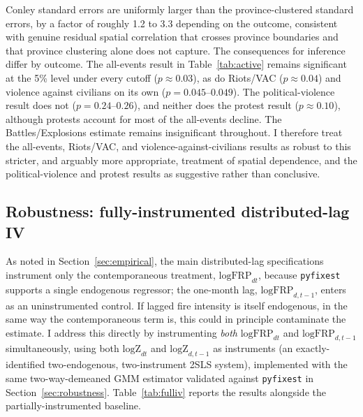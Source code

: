 \documentclass[12pt]{article}
\begin{document}
Conley standard errors are uniformly larger than the province-clustered standard errors, by a factor of roughly 1.2 to 3.3 depending on the outcome, consistent with genuine residual spatial correlation that crosses province boundaries and that province clustering alone does not capture. The consequences for inference differ by outcome. The all-events result in Table~\ref{tab:active} remains significant at the 5\% level under every cutoff ($p \approx 0.03$), as do Riots/VAC ($p \approx 0.04$) and violence against civilians on its own ($p=0.045$--$0.049$). The political-violence result does not ($p=0.24$--$0.26$), and neither does the protest result ($p \approx 0.10$), although protests account for most of the all-events decline. The Battles/Explosions estimate remains insignificant throughout. I therefore treat the all-events, Riots/VAC, and violence-against-civilians results as robust to this stricter, and arguably more appropriate, treatment of spatial dependence, and the political-violence and protest results as suggestive rather than conclusive.

\subsection{Robustness: fully-instrumented distributed-lag IV}
\label{sec:fulliv}

As noted in Section~\ref{sec:empirical}, the main distributed-lag specifications instrument only the contemporaneous treatment, $\text{logFRP}_{dt}$, because \texttt{pyfixest} supports a single endogenous regressor; the one-month lag, $\text{logFRP}_{d,t-1}$, enters as an uninstrumented control. If lagged fire intensity is itself endogenous, in the same way the contemporaneous term is, this could in principle contaminate the estimate. I address this directly by instrumenting \emph{both} $\text{logFRP}_{dt}$ and $\text{logFRP}_{d,t-1}$ simultaneously, using both $\text{logZ}_{dt}$ and $\text{logZ}_{d,t-1}$ as instruments (an exactly-identified two-endogenous, two-instrument 2SLS system), implemented with the same two-way-demeaned GMM estimator validated against \texttt{pyfixest} in Section~\ref{sec:robustness}. Table~\ref{tab:fulliv} reports the results alongside the partially-instrumented baseline.
\end{document}
